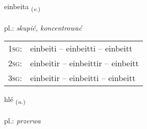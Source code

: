 \documentclass[frontgrid, backgrid]{flacards}\usepackage[]{graphicx}\usepackage[]{xcolor}
\begin{document}
\renewcommand{\blhead}{\vskip5pt {\small\bfseries\footnotesize Sagnorð | czasownik }}
\renewcommand{\bcfoot}{\vskip5pt \hspace{2pt}{\small\bfseries\footnotesize 3K}}


{einbeita \small{\textsubscript{(\textit{v.})}} \\[1ex] %
\textphonetic{[einpeita]} \\
pl.: \emph{skupić, koncentrować} \\  [2ex]
\renewcommand*{\arraystretch}{0.8}
\begin{tabular}{p{1cm}l}
\textsc{1sg}: & einbeiti -- einbeitti -- einbeitt \\ 
\textsc{2sg}: & einbeitir -- einbeittir -- einbeitt \\ 
\textsc{3sg}: & einbeitir -- einbeitti -- einbeitt \\ 
\end{tabular}
}

\renewcommand{\flhead}{\vskip5pt \fboxsep=0pt {\small\bfseries\footnotesize Nafnorð | rzeczownik}}
\renewcommand{\fcfoot}{\vskip5pt \fboxsep=0pt \hspace{2pt}{\small\bfseries\footnotesize 3K}}

\renewcommand{\blhead}{\vskip5pt {\small\bfseries\footnotesize Nafnorð | rzeczownik }}
\renewcommand{\bcfoot}{\vskip5pt \hspace{2pt}{\small\bfseries\footnotesize 3K}}


{hlé \small{\textsubscript{(\textit{n.})}} \\[1ex] %
\textphonetic{[l̥jɛː]} \\
pl.: \emph{przerwa} \\  [2ex]
\renewcommand*{\arraystretch}{0.8}
}
\end{document}
